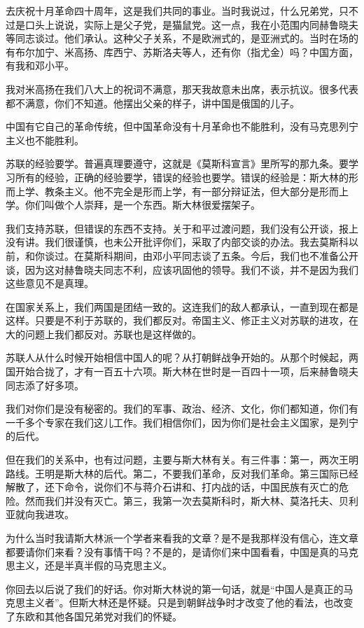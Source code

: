 去庆祝十月革命四十周年，这是我们共同的事业。当时我说过，什么兄弟党，只不过是口头上说说，实际上是父子党，是猫鼠党。这一点，我在小范围内同赫鲁晓夫等同志谈过。他们承认。这种父子关系，不是欧洲式的，是亚洲式的。当时在场的有布尔加宁、米高扬、库西宁、苏斯洛夫等人，还有你（指尤金）吗？中国方面，有我和邓小平。

我对米高扬在我们八大上的祝词不满意，那天我故意未出席，表示抗议。很多代表都不满意，你们不知道。他摆出父亲的样子，讲中国是俄国的儿子。

中国有它自己的革命传统，但中国革命没有十月革命也不能胜利，没有马克思列宁主义也不能胜利。

苏联的经验要学。普遍真理要遵守，这就是《莫斯科宣言》里所写的那九条。要学习所有的经验，正确的经验要学，错误的经验也要学。错误的经验是：斯大林的形而上学、教条主义。他不完全是形而上学，有一部分辩证法，但大部分是形而上学。你们叫做个人崇拜，是一个东西。斯大林很爱摆架子。

我们支持苏联，但错误的东西不支持。关于和平过渡问题，我们没有公开谈，报上没有讲。我们很谨慎，也未公开批评你们，采取了内部交谈的办法。我去莫斯科以前，和你谈过。在莫斯科期间，由邓小平同志谈了五条。今后，我们也不准备公开谈，因为这对赫鲁晓夫同志不利，应该巩固他的领导。我们不谈，并不是因为我们这些意见不是真理。

在国家关系上，我们两国是团结一致的。这连我们的敌人都承认，一直到现在都是这样。只要是不利于苏联的，我们都反对。帝国主义、修正主义对苏联的进攻，在大的问题上我们都反对。苏联也是这样做的。

苏联人从什么时候开始相信中国人的呢？从打朝鲜战争开始的。从那个时候起，两国开始合拢了，才有一百五十六项。斯大林在世时是一百四十一项，后来赫鲁晓夫同志添了好多项。

我们对你们是没有秘密的。我们的军事、政治、经济、文化，你们都知道，你们有一千多个专家在我们这儿工作。我们相信你们，因为你们是社会主义国家，是列宁的后代。

但在我们的关系中，也有过问题，主要与斯大林有关。有三件事：第一，两次王明路线。王明是斯大林的后代。第二，不要我们革命，反对我们革命。第三国际已经解散了，还下命令，说你们不与蒋介石讲和、打内战的话，中国民族有灭亡的危险。然而我们并没有灭亡。第三，我第一次去莫斯科时，斯大林、莫洛托夫、贝利亚就向我进攻。

为什么当时我请斯大林派一个学者来看我的文章？是不是我那样没有信心，连文章都要请你们来看？没有事情干吗？不是的，是请你们来中国看看，中国是真的马克思主义，还是半真半假的马克思主义。

你回去以后说了我们的好话。你对斯大林说的第一句话，就是“中国人是真正的马克思主义者”。但斯大林还是怀疑。只是到朝鲜战争时才改变了他的看法，也改变了东欧和其他各国兄弟党对我们的怀疑。

